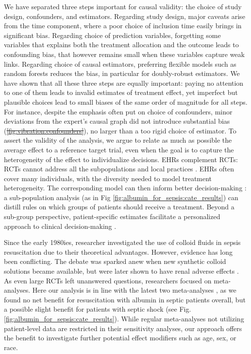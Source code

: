 \documentclass[10pt,letterpaper]{article}
\providecommand{\DIFaddtex}[1]{{\protect\color{blue}\uwave{#1}}} %
\providecommand{\DIFdeltex}[1]{{\protect\color{red}\sout{#1}}}                      %
\providecommand{\DIFaddbegin}{} %
\providecommand{\DIFaddend}{} %
\providecommand{\DIFdelbegin}{} %
\providecommand{\DIFdelend}{} %
\providecommand{\DIFadd}[1]{\texorpdfstring{\DIFaddtex{#1}}{#1}} %
\providecommand{\DIFdel}[1]{\texorpdfstring{\DIFdeltex{#1}}{}} %
\newcommand{\DIFscaledelfig}{0.5}
\newlength{\DIFdelgraphicswidth} %
\newlength{\DIFdelgraphicsheight} %
\newcommand{\DIFaddincludegraphics}[2][]{{\color{blue}\fbox{\DIFOincludegraphics[#1]{#2}}}} %
\newcommand{\DIFdelincludegraphics}[2][]{%
\sbox{\DIFdelgraphicsbox}{\DIFOincludegraphics[#1]{#2}}%
\settoboxwidth{\DIFdelgraphicswidth}{\DIFdelgraphicsbox} %
\settoboxtotalheight{\DIFdelgraphicsheight}{\DIFdelgraphicsbox} %
\scalebox{\DIFscaledelfig}{%
\parbox[b]{\DIFdelgraphicswidth}{\usebox{\DIFdelgraphicsbox}\\[-\baselineskip] \rule{\DIFdelgraphicswidth}{0em}}\llap{\resizebox{\DIFdelgraphicswidth}{\DIFdelgraphicsheight}{%
\setlength{\unitlength}{\DIFdelgraphicswidth}%
\begin{picture}(1,1)%
\thicklines\linethickness{2pt} %
{\color[rgb]{1,0,0}\put(0,0){\framebox(1,1){}}}%
{\color[rgb]{1,0,0}\put(0,0){\line( 1,1){1}}}%
{\color[rgb]{1,0,0}\put(0,1){\line(1,-1){1}}}%
\end{picture}%
}\hspace*{3pt}}} %
} %
\DeclareRobustCommand{\DIFaddbegin}{\DIFOaddbegin \let\includegraphics\DIFaddincludegraphics} %
\DeclareRobustCommand{\DIFaddend}{\DIFOaddend \let\includegraphics\DIFOincludegraphics} %
\DeclareRobustCommand{\DIFdelbegin}{\DIFOdelbegin \let\includegraphics\DIFdelincludegraphics} %
\DeclareRobustCommand{\DIFdelend}{\DIFOaddend \let\includegraphics\DIFOincludegraphics} %
\begin{document}
We have separated three steps important for causal validity: the choice
of study design, confounders, and estimators.
%
Regarding study design, major caveats arise from the time component,
where a poor choice of inclusion time easily brings in significant bias. Regarding choice of prediction
variables, forgetting some variables that explains both the treatment
allocation and the outcome leads to confounding bias, that however
remains small when these
variables capture weak links. Regarding choice of causal estimators,
preferring flexible models such as random forests reduces the bias, in
particular for doubly-robust estimators.
%
We have shown that all these three steps are equally important: paying no
attention to one of them leads to invalid estimates of treatment effect,
yet imperfect but plausible choices lead to small biases of the same
order of magnitude for all steps.
%
For instance, despite the emphasis often put on choice of confounders,
minor deviations from the expert's causal graph did not introduce
substantial bias (\DIFdelbegin \DIFdel{\ref{fig:vibration:confounders}}\DIFdelend \DIFaddbegin \DIFadd{\ref{fig:vibration_analysis}b)}\DIFaddend ), no larger than a too
rigid choice of estimator.
To assert the validity of the analysis, we argue to relate as much as
possible the average effect to a reference target trial, even when the
goal is to capture the heterogeneity of the effect to individualize
decisions.
EHRs complement RCTs: RCTs cannot address all the
subpopulations and local practices
\cite{travers2007external,kennedy2015literature}. EHRs often cover many
individuals, with the diversity needed to model treatment
heterogeneity. The corresponding model can then inform better
decision-making \cite{prosperi2020causal}: a sub-population analysis  (as in Fig
\ref{fig:albumin_for_sepsis:cate_results}) can distill rules on which groups
of patients should receive a treatment. Beyond a sub-group perspective,
patient-specific estimates facilitate a personalized approach
to clinical decision-making \cite{kent2018personalized}.

Since the early 1980ies, researcher investigated the use of colloid fluids in
sepsis resuscitation due to their theoretical advantages. However, evidence has
long been conflicting. The debate was sparked anew when new synthetic colloid
solutions became available, but were later shown to have renal adverse effects
\cite{xu2014comparison}. As even large RCTs left unanswered questions,
researchers focused on meta-analyses. Here our analysis is in line with the
latest two meta-analyses \cite{xu2014comparison,li2020resuscitation}, as we
found no net benefit for resuscitation with albumin in septic patients overall,
but a possible slight benefit for patients with septic shock (see Fig.
\ref{fig:albumin_for_sepsis:cate_results}). While regular meta-analyses not
utilizing patient-level data are restricted in their sensitivity analyses, our
approach offers the benefit to investigate further potential effect modifiers
such as age, sex, or race.
\end{document}
